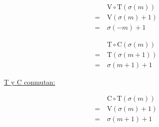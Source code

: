 \begin{center}
\begin{multicols}{3}
			\begin{align*}
			&\ \text{V}\circ\text{T}(\sigma(m))\\
			=&\ \text{V}(\sigma(m)+1)\\
			=&\ \sigma(-m)+1
			\end{align*}
		\end{multicols}
		
		\begin{multicols}{3}
			\begin{align*}
			&\ \text{T}\circ\text{C}(\sigma(m))\\
			=&\ \text{T}(\sigma(m+1))\\
			=&\ \sigma(m+1)+1
			\end{align*}
			
			\underline{T y C conmutan:}
			
			\begin{align*}
			&\ \text{C}\circ\text{T}(\sigma(m))\\
			=&\ \text{V}(\sigma(m)+1)\\
			=&\ \sigma(m+1)+1
			\end{align*}
		\end{multicols}
	\end{center}